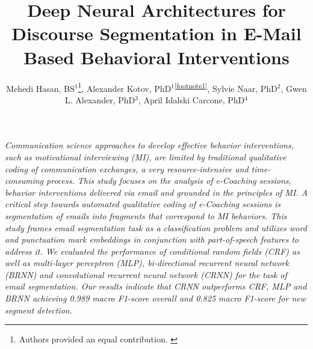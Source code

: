 \documentclass{amia}
\begin{document}
\title{Deep Neural Architectures for Discourse Segmentation in E-Mail Based Behavioral Interventions}

\author{Mehedi Hasan, BS$^{1}$\footnote{Authors provided an equal contribution. \label{footnote1}}, Alexander Kotov, PhD$^{1}$\textsuperscript{\ref{footnote1}}, Sylvie Naar, PhD$^{2}$, Gwen L. Alexander, PhD$^{3}$, April Idalski Carcone, PhD$^{4}$}


\maketitle

\textit{Communication science approaches to develop effective behavior interventions, such as motivational interviewing (MI), are limited by traditional qualitative coding of communication exchanges, a very resource-intensive and time-consuming process. This study focuses on the analysis of e-Coaching sessions, behavior interventions delivered via email and grounded in the principles of MI. A critical step towards automated qualitative coding of e-Coaching sessions is segmentation of emails into fragments that correspond to MI behaviors. This study frames email segmentation task as a classification problem and utilizes word and punctuation mark embeddings in conjunction with part-of-speech features to address it. We evaluated the performance of conditional random fields (CRF) as well as multi-layer perceptron (MLP), bi-directional recurrent neural network (BRNN) and convolutional recurrent neural network (CRNN) for the task of email segmentation. Our results indicate that CRNN outperforms CRF, MLP and BRNN achieving 0.989 macro F1-score overall and 0.825 macro F1-score for new segment detection.}
\end{document}
